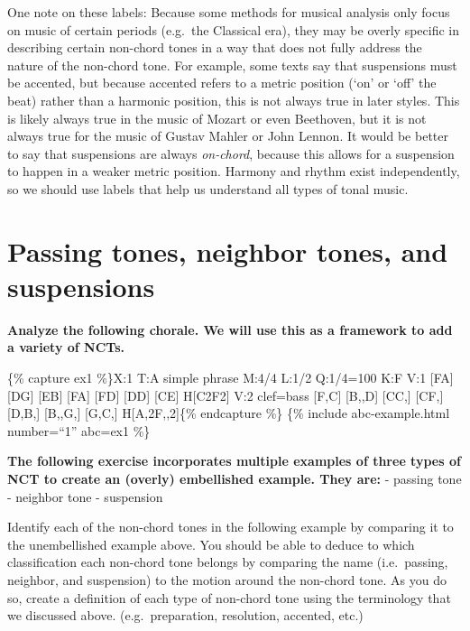 \documentclass{book}
\begin{document}
One note on these labels: Because some methods for musical analysis only focus
on music of certain periods (e.g.~the Classical era), they may be overly
specific in describing certain non-chord tones in a way that does not fully
address the nature of the non-chord tone. For example, some texts say that
suspensions must be accented, but because accented refers to a metric position
(`on' or `off' the beat) rather than a harmonic position, this is not always
true in later styles. This is likely always true in the music of Mozart or
even Beethoven, but it is not always true for the music of Gustav Mahler or
John Lennon. It would be better to say that suspensions are always
\emph{on-chord}, because this allows for a suspension to happen in a weaker
metric position. Harmony and rhythm exist independently, so we should use
labels that help us understand all types of tonal music.

\hypertarget{passing-tones-neighbor-tones-and-suspensions}{%
\section{Passing tones, neighbor tones, and
suspensions}\label{passing-tones-neighbor-tones-and-suspensions}}

\textbf{Analyze the following chorale. We will use this as a framework to add
a variety of NCTs.}

\{\% capture ex1 \%\}X:1 T:A simple phrase M:4/4 L:1/2 Q:1/4=100 K:F V:1
{[}FA{]}\textbar{} {[}DG{]} {[}EB{]}\textbar{} {[}FA{]} {[}FD{]}\textbar{}
{[}DD{]} {[}CE{]}\textbar{} H{[}C2F2{]}\textbar{]} V:2 clef=bass
{[}F,C{]}\textbar{} {[}B,,D{]} {[}CC,{]}\textbar{} {[}CF,{]}
{[}D,B,{]}\textbar{} {[}B,,G,{]} {[}G,C,{]}\textbar{}
H{[}A,2F,,2{]}\textbar{]}\{\% endcapture \%\} \{\% include abc-example.html
number=``1'' abc=ex1 \%\}

\textbf{The following exercise incorporates multiple examples of three types
of NCT to create an (overly) embellished example. They are:} - passing tone -
neighbor tone - suspension

Identify each of the non-chord tones in the following example by comparing it
to the unembellished example above. You should be able to deduce to which
classification each non-chord tone belongs by comparing the name
(i.e.~passing, neighbor, and suspension) to the motion around the non-chord
tone. As you do so, create a definition of each type of non-chord tone using
the terminology that we discussed above. (e.g.~preparation, resolution,
accented, etc.)
\end{document}
